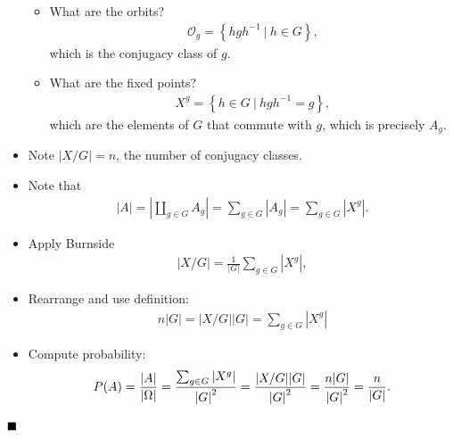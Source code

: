 \begin{solution}
\begin{itemize}
  \begin{itemize}
  \item
    What are the orbits?
    \begin{align*}
    \mathcal{O}_g = \left\{{hgh^{-1}{~\mathrel{\Big|}~}h\in G}\right\}
    ,\end{align*}
    which is the conjugacy class of \(g\).
  \item
    What are the fixed points?
    \begin{align*}X^g = \left\{{h\in G {~\mathrel{\Big|}~}hgh^{-1}= g}\right\},\end{align*}
    which are the elements of \(G\) that commute with \(g\), which is
    precisely \(A_g\).
  \end{itemize}
\item
  Note \({\left\lvert {X/G} \right\rvert} = n\), the number of conjugacy
  classes.
\item
  Note that
  \begin{align*}
  {\left\lvert {A} \right\rvert} = {\left\lvert {{\coprod}_{g\in G} A_g} \right\rvert} = \sum_{g\in G} {\left\lvert {A_g} \right\rvert} = \sum_{g\in G}{\left\lvert {X^g} \right\rvert}
  .\end{align*}
\item
  Apply Burnside
  \begin{align*}
  {\left\lvert {X / G} \right\rvert} = \frac { 1 } { | G | } \sum _ { g \in G } \left| X ^ { g } \right|,
  \end{align*}
\item
  Rearrange and use definition:
  \begin{align*}
  n {\left\lvert {G} \right\rvert}
  = {\left\lvert {X/G} \right\rvert} {\left\lvert {G} \right\rvert}
  = \sum _ { g \in G } \left| X ^ { g } \right|
  \end{align*}
\item
  Compute probability:
  \begin{align*}
  P(A)
  = {{\left\lvert {A} \right\rvert} \over {\left\lvert {\Omega} \right\rvert}} 
  = \frac{\sum_{ g \in G } \left| X ^ { g } \right|}{{\left\lvert {G} \right\rvert}^2} 
  = \frac{{\left\lvert {X/G} \right\rvert}{\left\lvert {G} \right\rvert}}{{\left\lvert {G} \right\rvert}^2} 
  = \frac{n {\left\lvert {G} \right\rvert}}{{\left\lvert {G} \right\rvert}^2} 
  = \frac n {{\left\lvert {G} \right\rvert}}
  .\end{align*}
\end{itemize}

\(\hfill\blacksquare\)


\end{solution}

